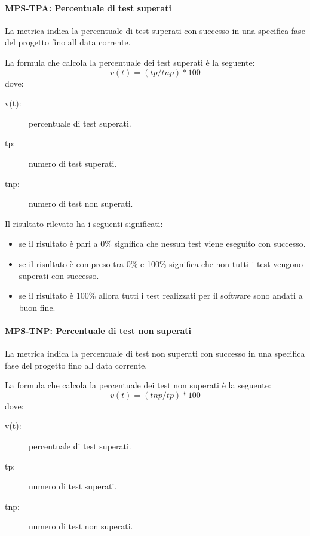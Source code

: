 \documentclass[../../norme-di-progetto.tex]{subfiles}
\begin{document}
\paragraph{MPS-TPA: Percentuale di test superati}%
\label{par:MPS-TPA_test_passati}

La metrica indica la percentuale di test superati con successo in una specifica fase del progetto fino all data corrente.

La formula che calcola la percentuale dei test superati è la seguente:
\[
 v(t) = (tp / tnp) * 100
\]
dove:
\begin{description}
 \item[v(t):] percentuale di test superati. %
 \item[tp:] numero di test superati.
 \item[tnp:] numero di test non superati.

\end{description}

Il risultato rilevato ha i seguenti significati:
\begin{itemize}
  \item se il risultato è pari a 0\% significa che nessun test viene eseguito con successo.
  \item se il risultato è compreso tra 0\% e 100\% significa che non tutti i test vengono superati con successo.
  \item se il risultato è 100\% allora tutti i test realizzati per il software sono andati a buon fine.
\end{itemize}




\paragraph{MPS-TNP: Percentuale di test non superati}%
\label{par:MPS-TNP_test_non_passati}

La metrica indica la percentuale di test non superati con successo in una specifica fase del progetto fino all data corrente.

La formula che calcola la percentuale dei test non superati è la seguente:
\[
 v(t) = (tnp / tp) * 100
\]
dove:
\begin{description}
 \item[v(t):] percentuale di test superati. %
 \item[tp:] numero di test superati.
 \item[tnp:] numero di test non superati.

\end{description}
\end{document}
